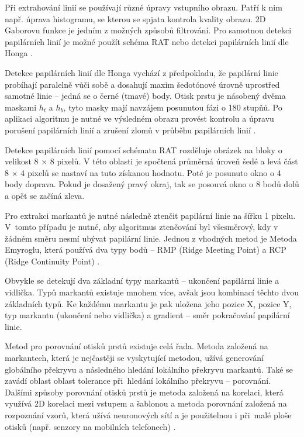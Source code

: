 Při extrahování linií se používají různé úpravy vstupního obrazu. Patří k nim např. úprava histogramu, se kterou se spjata kontrola kvality obrazu. 2D Gaborovu funkce je jedním z možných způsobů filtrování. Pro samotnou detekci papilárních linií je možné použít schéma RAT nebo detekci papilárních linií dle Honga \cite{BIOopora}. 

Detekce papilárních linií dle Honga vychází z předpokladu, že papilární linie probíhají paralelně vůči sobě a dosahují maxim šedotónové úrovně uprostřed samotné linie -- jedná se o černé (tmavé) body. Otisk prstu je násobený dvěma maskami $h_t$ a $h_b$, tyto masky mají navzájem posunutou fázi o 180 stupňů. Po aplikaci algoritmu je nutné ve výsledném obrazu provést kontrolu a úpravu porušení papilárních linií a zrušení zlomů v průběhu papilárních linií \cite{BIOotiskyLecture}.

Detekce papilárních linií pomocí schématu RAT rozděluje obrázek na bloky o velikost 8 $\times$ 8 pixelů. V této oblasti je spočtená průměrná úroveň šedé a levá část 8 $\times$ 4 pixelů se nastaví na tuto získanou hodnotu. Poté je posunuto okno o 4 body doprava. Pokud je dosažený pravý okraj, tak se posouvá okno o 8 bodů dolů a opět se začíná zleva.

Pro extrakci markantů je nutné následně ztenčit papilární linie na šířku 1 pixelu. V~tomto případu je nutné, aby algoritmus ztenčování byl všesměrový, kdy v žádném směru nesmí ubývat papilární linie. Jednou z vhodných metod je Metoda Emyroglu, která používá dva typy bodů -- RMP (Ridge Meeting Point) a RCP (Ridge Continuity Point) \cite{BIOopora}.

Obvykle se detekují dva základní typy markantů -- ukončení papilární linie a vidlička. Typů markantů existuje mnohem více, avšak jsou kombinací těchto dvou základních typů. Ke každému markantu je pak uložena jeho pozice X, pozice Y, typ markantu (ukončení nebo vidlička) a gradient -- směr pokračování papilární linie.

Metod pro porovnání otisků prstů existuje celá řada. Metoda založená na markantech, která je nejčastěji se vyskytující metodou, užívá generování globálního překryvu a následného hledání lokálního překryvu markantů. Také se zavádí oblast oblast tolerance při~hledání lokálního překryvu -- porovnání. Dalšími způsoby porovnání otisků prstů je metoda založená na korelaci, která využívá 2D korelaci mezi vstupem a šablonou a metoda porovnání založená na rozpoznání vzorů, která užívá neuronových sítí a je použitelnou i při~malé ploše otisků (např. senzory na mobilních telefonech) \cite{BIOotiskyLecture}.

